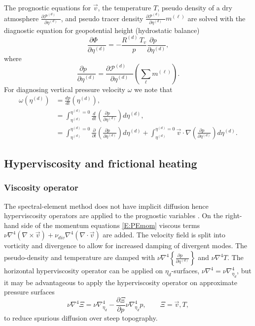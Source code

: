 \documentclass{agujournal}
\begin{document}
The prognostic equations for $\vec{v}$, the temperature $T$, pseudo density of a dry atmosphere ${\frac{\partial {\mathcal{P}^{(d)}}\quad }{\partial \eta^{(d)}}}$, and pseudo tracer density ${\frac{\partial {\mathcal{P}^{(d)}}\quad }{\partial \eta^{(d)}}} m^{(\ell)}$ are solved with the diagnostic equation for geopotential height (hydrostatic balance)
\begin{equation}
\frac{\partial \Phi\quad }{\partial \eta^{(d)}}=-\frac{R^{(d)} \,T_v}{p}\frac{\partial p\quad }{\partial \eta^{(d)}},\label{eq:phi_1}
\end{equation}
where
\begin{equation}
\frac{\partial p\quad }{\partial \eta^{(d)}}=\frac{\partial \mathcal{P}^{(d)}\quad }{\partial \eta^{(d)}}\left( \sum_\ell m^{(\ell)}\right).
\end{equation}
For diagnosing vertical pressure velocity $\omega$ we note that
\begin{align}
\omega(\eta^{(d)})&=\frac{dp}{dt}(\eta^{(d)}),\\
      &=\int_{\eta^{(d)}}^{\eta^{(d)}=0}\frac{d}{dt}\left( \frac{\partial p\quad }{\partial \eta^{(d)}}\right)d\eta^{(d)},\\
      &=\int_{\eta^{(d)}}^{\eta^{(d)}=0}\frac{\partial}{\partial t}\left( \frac{\partial p\quad }{\partial \eta^{(d)}}\right)d\eta^{(d)}+\int_{\eta^{(d)}}^{\eta^{(d)}=0} \vec{v}\cdot \nabla \left( \frac{\partial p\quad }{\partial \eta^{(d)}}\right)d\eta^{(d)}.\label{eq:omega}
\end{align}
\subsection{Hyperviscosity and frictional heating}
\subsubsection{Viscosity operator {\color{red}{[NEEDS WORK!]}}}
The spectral-element method does not have implicit diffusion hence hyperviscosity operators are applied to the prognostic variables {\color{red}{[Taylor reference]}}. On the right-hand side of the momentum equations \eqref{E:PEmom} viscous terms $\nu \nabla^4 \left( \nabla \times \vec{v}\right)+\nu_{div}\nabla^4 \left( \nabla \cdot \vec{v}\right)$ are added. The velocity field is split into vorticity and divergence to allow for increased damping of divergent modes. The pseudo-density and temperature are damped with $\nu \nabla^4\left\{ \frac{\partial p\quad }{\partial \eta^{(d)}}\right\}$ and $\nu \nabla^4 T$. The horizontal hyperviscosity operator can be applied on $\eta_d$-surfaces, $\nu \nabla^4=\nu \nabla^4_{\eta_d}$, but it may be advantageous to apply the hyperviscosity operator on approximate pressure surfaces
\begin{equation}
\nu \nabla^4 \Xi =\nu \nabla^4_{\eta_d}-\frac{\partial \Xi}{\partial p}\nu \nabla^4_{\eta_d}p,\qquad \Xi=\vec{v}, T,
\end{equation}
\citep[p.58 in ][]{CAM5} to reduce spurious diffusion over steep topography.
\end{document}
